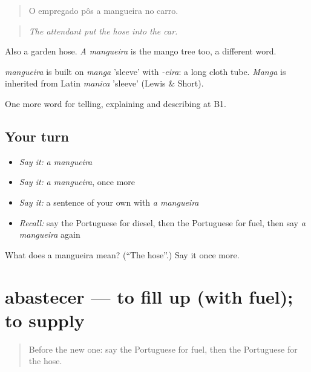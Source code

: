 \begin{quote}
O empregado pôs a mangueira no carro.
\end{quote}

\begin{quote}
\emph{The attendant put the hose into the car.}
\end{quote}

Also a garden hose. \emph{A mangueira} is the mango tree too, a different word.

\begin{cousinweb}
\emph{mangueira} is built on \emph{manga} 'sleeve' with \emph{-eira}: a long cloth tube. \emph{Manga} is inherited from Latin \emph{manica} 'sleeve' (Lewis \& Short).
\end{cousinweb}

\begin{grammarlens}[title={What you've built}]
One more word for telling, explaining and describing at B1.
\end{grammarlens}

\subsection*{Your turn}
\begin{itemize}
\raggedright
  \item \emph{Say it:} \emph{a mangueira}
  \item \emph{Say it:} \emph{a mangueira}, once more
  \item \emph{Say it:} a sentence of your own with \emph{a mangueira}
  \item \emph{Recall:} say the Portuguese for diesel, then the Portuguese for fuel, then say \emph{a mangueira} again
\end{itemize}

\begin{tcolorbox}[breakable,colback=teal!4,colframe=teal!35!black,title={Before you move on}]
What does a mangueira mean? (\textquotedblleft{}The hose\textquotedblright{}.) Say it once more.
\end{tcolorbox}
\section[abastecer]{abastecer — to fill up (with fuel); to supply}

\label{lesson:PT-C404-abastecer}



\begin{quote}
Before the new one: say the Portuguese for fuel, then the Portuguese for the hose.
\end{quote}

